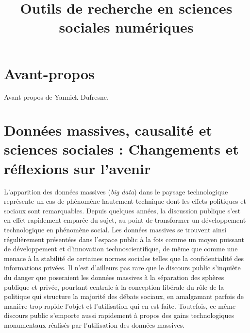 \documentclass[
  letterpaper,
  DIV=11,
  numbers=noendperiod]{scrreprt}
\title{Outils de recherche en sciences sociales numériques}
\author{}
\date{}
\renewcommand*\contentsname{Table of contents}
\newcommand\contentsname{Table of contents}
\begin{document}
\maketitle

\renewcommand*\contentsname{Table of contents}
{
\hypersetup{linkcolor=}
\setcounter{tocdepth}{2}
\tableofcontents
}

\chapter*{Avant-propos}\label{avant-propos}


Avant propos de Yannick Dufresne.


\chapter*{Données massives, causalité et sciences sociales : Changements
et réflexions sur
l'avenir}\label{donnuxe9es-massives-causalituxe9-et-sciences-sociales-changements-et-ruxe9flexions-sur-lavenir}


L'apparition des données massives (\emph{big data}) dans le paysage
technologique représente un cas de phénomène hautement technique dont
les effets politiques et sociaux sont remarquables. Depuis quelques
années, la discussion publique s'est en effet rapidement emparée du
sujet, au point de transformer un développement technologique en
phénomène social. Les données massives se trouvent ainsi régulièrement
présentées dans l'espace public à la fois comme un moyen puissant de
développement et d'innovation technoscientifique, de même que comme une
menace à la stabilité de certaines normes sociales telles que la
confidentialité des informations privées. Il n'est d'ailleurs pas rare
que le discours public s'inquiète du danger que poseraient les données
massives à la séparation des sphères publique et privée, pourtant
centrale à la conception libérale du rôle de la politique qui structure
la majorité des débats sociaux, en amalgamant parfois de manière trop
rapide l'objet et l'utilisation qui en est faite. Toutefois, ce même
discours public s'emporte aussi rapidement à propos des gains
technologiques monumentaux réalisés par l'utilisation des données
massives.
\end{document}
